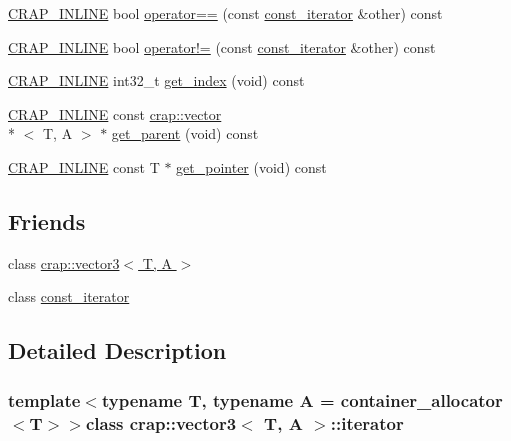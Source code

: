 \begin{DoxyCompactItemize}
\item 
\hyperlink{config__x86_8h_a5a40526b8d842e7ff731509998bb0f1c}{C\+R\+A\+P\+\_\+\+I\+N\+L\+I\+N\+E} bool \hyperlink{classcrap_1_1vector3_1_1iterator_a0071b46d8d0d07bfa14feb27e10972af}{operator==} (const \hyperlink{classcrap_1_1vector3_1_1const__iterator}{const\+\_\+iterator} \&other) const 
\item 
\hyperlink{config__x86_8h_a5a40526b8d842e7ff731509998bb0f1c}{C\+R\+A\+P\+\_\+\+I\+N\+L\+I\+N\+E} bool \hyperlink{classcrap_1_1vector3_1_1iterator_a82864c99a146b10279743273a13631cf}{operator!=} (const \hyperlink{classcrap_1_1vector3_1_1const__iterator}{const\+\_\+iterator} \&other) const 
\item 
\hyperlink{config__x86_8h_a5a40526b8d842e7ff731509998bb0f1c}{C\+R\+A\+P\+\_\+\+I\+N\+L\+I\+N\+E} int32\+\_\+t \hyperlink{classcrap_1_1vector3_1_1iterator_af91e153e5a12f80860d5fbd0ba30dec0}{get\+\_\+index} (void) const 
\item 
\hyperlink{config__x86_8h_a5a40526b8d842e7ff731509998bb0f1c}{C\+R\+A\+P\+\_\+\+I\+N\+L\+I\+N\+E} const \hyperlink{classcrap_1_1vector}{crap\+::vector}\\*
$<$ T, A $>$ $\ast$ \hyperlink{classcrap_1_1vector3_1_1iterator_a6108d1aa323a8a54d1ce27a98c4194f6}{get\+\_\+parent} (void) const 
\item 
\hyperlink{config__x86_8h_a5a40526b8d842e7ff731509998bb0f1c}{C\+R\+A\+P\+\_\+\+I\+N\+L\+I\+N\+E} const T $\ast$ \hyperlink{classcrap_1_1vector3_1_1iterator_aee6c373cbb289328d2de6db6d8df122f}{get\+\_\+pointer} (void) const 
\end{DoxyCompactItemize}
\subsection*{Friends}
\begin{DoxyCompactItemize}
\item 
class \hyperlink{classcrap_1_1vector3_1_1iterator_ad48a63b58dfe30a0d7ebfbdaa4a57e2b}{crap\+::vector3$<$ T, A $>$}
\item 
class \hyperlink{classcrap_1_1vector3_1_1iterator_ac220ce1c155db1ac44146c12d178056f}{const\+\_\+iterator}
\end{DoxyCompactItemize}


\subsection{Detailed Description}
\subsubsection*{template$<$typename T, typename A = container\+\_\+allocator$<$\+T$>$$>$class crap\+::vector3$<$ T, A $>$\+::iterator}



